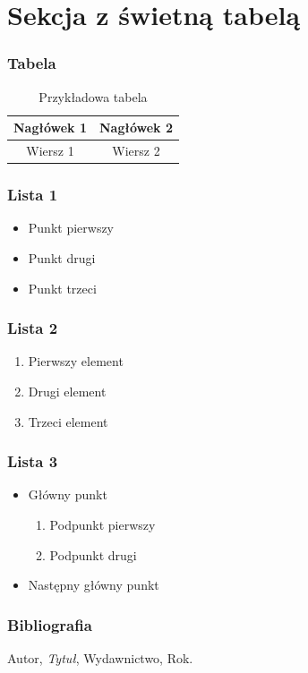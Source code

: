 \documentclass{beamer}
\begin{document}
\section{Sekcja z świetną tabelą}
\begin{frame}
\frametitle{Tabela}
\begin{table}
\begin{tabular}{|c|c|}
\hline
Nagłówek 1 & Nagłówek 2 \\
\hline
Wiersz 1 & Wiersz 2 \\
\hline
\end{tabular}
\caption{Przykładowa tabela}
\end{table}
\end{frame}
\begin{frame}
\frametitle{Lista 1}
\begin{itemize}
    \item Punkt pierwszy
    \item Punkt drugi
    \item Punkt trzeci
\end{itemize}
\end{frame}

\begin{frame}
\frametitle{Lista 2}
\begin{enumerate}
    \item Pierwszy element
    \item Drugi element
    \item Trzeci element
\end{enumerate}
\end{frame}

\begin{frame}
\frametitle{Lista 3}
\begin{itemize}
    \item Główny punkt
    \begin{enumerate}
        \item Podpunkt pierwszy
        \item Podpunkt drugi
    \end{enumerate}
    \item Następny główny punkt
\end{itemize}
\end{frame}

\begin{frame}[allowframebreaks]
\frametitle{Bibliografia}
\begin{thebibliography}{10}
 Autor, \emph{Tytuł}, Wydawnictwo, Rok.
\end{thebibliography}
\end{frame}
\end{document}
